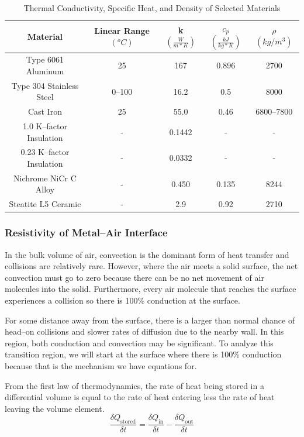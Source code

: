 \documentclass[10pt, twocolumn]{article}
\begin{document}
\begin{table}
\centering
\caption{Thermal Conductivity, Specific Heat, and Density of Selected Materials}
\begin{tabular}{c | c | c | c | c}
\hline\hline
Material	&Linear Range $(^{o}C)$	&k \(\left(\frac{W}{m*K}\right)\)	&\(c_{p}\) \(\left(\frac{kJ}{kg*K}\right)\)	&\(\rho\) \((kg/m^{3})\)	\\
\hline
Type 6061 Aluminum		&25	&167	&0.896	&2700	\\
Type 304 Stainless Steel	&0--100	&16.2	&0.5	&8000	\\
Cast Iron			&25	&55.0	&0.46	&6800--7800	\\
1.0 K--factor Insulation	&-	&0.1442	&-	&-	\\
0.23 K--factor Insulation	&-	&0.0332	&-	&-	\\
Nichrome NiCr C Alloy		&-	&0.450	&0.135	&8244	\\
Steatite L5 Ceramic		&-	&2.9	&0.92	&2710	\\
\hline\hline
\end{tabular}
\label{thermal-properties-table}
\end{table}

\subsubsection*{Resistivity of Metal--Air Interface}

In the bulk volume of air, convection is the dominant form of heat
transfer and collisions are relatively rare. However, where the
air meets a solid surface, the net convection must go to zero because
there can be no net movement of air molecules into the solid.
Furthermore, every air molecule that reaches the surface experiences
a collision so there is 100\% conduction at the surface.

For some distance away from the surface, there is a larger than
normal chance of head--on collisions and slower rates of diffusion
due to the nearby wall. In this region, both conduction and convection
may be significant. To analyze this transition region,
we will start at the surface where there is 100\% conduction
because that is the mechanism we have equations for.

From the first law of thermodynamics, the rate of heat being stored
in a differential volume is equal to the rate of heat entering less
the rate of heat leaving the volume element.
\begin{equation*}
\frac{\delta Q_{\textrm{stored}}}{\delta t}=
\frac{\delta Q_{\textrm{in}}}{\delta t}-
\frac{\delta Q_{\textrm{out}}}{\delta t}
\end{equation*}
\end{document}

